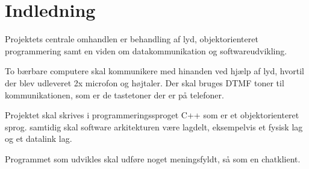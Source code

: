 \section{Indledning}
Projektets centrale omhandlen er behandling af lyd, objektorienteret programmering samt en viden om datakommunikation og softwareudvikling.

To bærbare computere skal kommunikere med hinanden ved hjælp af lyd, hvortil der blev udleveret 2x microfon og højtaler.
Der skal bruges DTMF toner til kommunikationen, som er de tastetoner der er på telefoner.

Projektet skal skrives i programmeringssproget C++ som er et objektorienteret sprog.
samtidig skal software arkitekturen være lagdelt, eksempelvis et fysisk lag og et datalink lag.

Programmet som udvikles skal udføre noget meningsfyldt, så som en chatklient.